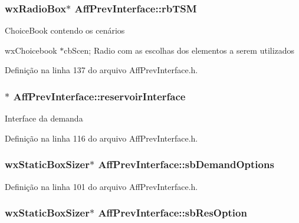 \subsubsection[{rb\+T\+SM}]{\setlength{\rightskip}{0pt plus 5cm}wx\+Radio\+Box$\ast$ Aff\+Prev\+Interface\+::rb\+T\+SM}\label{class_aff_prev_interface_ae667175652e1b046eef2c6275ce79400}
Choice\+Book contendo os cenários

wx\+Choicebook $\ast$cb\+Scen; Radio com as escolhas dos elementos a serem utilizados 

Definição na linha 137 do arquivo Aff\+Prev\+Interface.\+h.

\subsubsection[{reservoir\+Interface}]{$\ast$ Aff\+Prev\+Interface\+::reservoir\+Interface}\label{class_aff_prev_interface_adf9323b57ce18310ae4cb15bd5411906}
Interface da demanda 

Definição na linha 116 do arquivo Aff\+Prev\+Interface.\+h.

\subsubsection[{sb\+Demand\+Options}]{\setlength{\rightskip}{0pt plus 5cm}wx\+Static\+Box\+Sizer$\ast$ Aff\+Prev\+Interface\+::sb\+Demand\+Options}\label{class_aff_prev_interface_ad8428e1a1613d9befe2c6c166f80e327}


Definição na linha 101 do arquivo Aff\+Prev\+Interface.\+h.

\subsubsection[{sb\+Res\+Option}]{\setlength{\rightskip}{0pt plus 5cm}wx\+Static\+Box\+Sizer$\ast$ Aff\+Prev\+Interface\+::sb\+Res\+Option}\label{class_aff_prev_interface_a24bf0528edad2f777405780f1ed6d57f}


